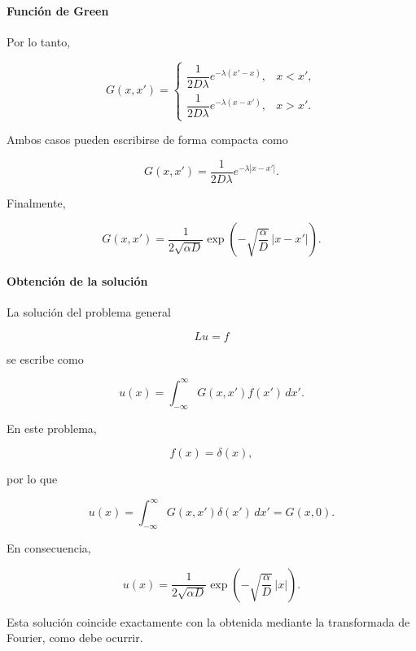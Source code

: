 \documentclass[11pt,spanish]{article}
\newcounter{problema}
\begin{document}
\paragraph{Función de Green}

Por lo tanto,

\[
G(x,x')
=
\begin{cases}
\dfrac{1}{2D\lambda}
e^{-\lambda(x'-x)},
&
x<x',
\\[3mm]
\dfrac{1}{2D\lambda}
e^{-\lambda(x-x')},
&
x>x'.
\end{cases}
\]

Ambos casos pueden escribirse de forma compacta como

\begin{equation}
\boxed{
G(x,x')
=
\frac{1}{2D\lambda}
e^{-\lambda|x-x'|}.
}
\end{equation}

Finalmente,

\begin{equation}
\boxed{
G(x,x')
=
\frac{1}{2\sqrt{\alpha D}}
\exp\!\left(
-\sqrt{\frac{\alpha}{D}}
\,|x-x'|
\right).
}
\end{equation}

\paragraph{Obtención de la solución}

La solución del problema general

\[
Lu=f
\]

se escribe como

\begin{equation}
u(x)
=
\int_{-\infty}^{\infty}
G(x,x')f(x')\,dx'.
\end{equation}

En este problema,

\[
f(x)=\delta(x),
\]

por lo que

\begin{equation}
u(x)
=
\int_{-\infty}^{\infty}
G(x,x')\delta(x')\,dx'
=
G(x,0).
\end{equation}

En consecuencia,

\begin{equation}
\boxed{
u(x)
=
\frac{1}{2\sqrt{\alpha D}}
\exp\!\left(
-\sqrt{\frac{\alpha}{D}}
\,|x|
\right).
}
\end{equation}

Esta solución coincide exactamente con la obtenida mediante la transformada de Fourier, como debe ocurrir.
\end{document}
